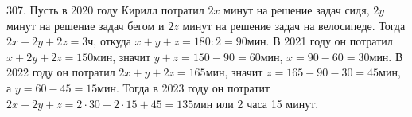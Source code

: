 307. Пусть в 2020 году Кирилл потратил $2x$ минут на решение задач сидя, $2y$ минут на решение задач бегом и $2z$ минут на решение задач на велосипеде. Тогда
$2x+2y+2z=3$ч, откуда $x+y+z=180:2=90$мин. В 2021 году он потратил $x+2y+2z=150$мин, значит $y+z=150-90=60$мин, $x=90-60=30$мин. В 2022 году он потратил $2x+y+2z=165$мин, значит $z=165-90-30=45$мин, а $y=60-45=15$мин. Тогда в 2023 году он потратит $2x+2y+z=2\cdot30+2\cdot15+45=135$мин или 2 часа 15 минут.\\

